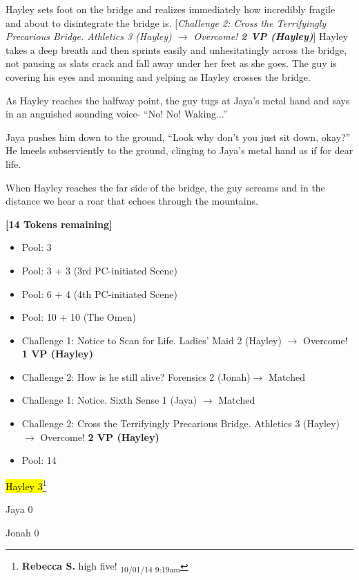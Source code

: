 Hayley sets foot on the bridge and realizes immediately how incredibly fragile and about to disintegrate the bridge is.  {[}\textit{Challenge 2: Cross the Terrifyingly Precarious Bridge.  Athletics 3 (Hayley) $\rightarrow$ Overcome! }\textit{\textbf{2 VP (Hayley)}}{]}  Hayley takes a deep breath and then sprints easily and unhesitatingly across the bridge, not pausing as slats crack and fall away under her feet as she goes.  The guy is covering his eyes and moaning and yelping as Hayley crosses the bridge.

As Hayley reaches the halfway point, the guy tugs at Jaya's metal hand and says in an anguished sounding voice- ``No!  No!  Waking...''

Jaya pushes him down to the ground, ``Look why don't you just sit down, okay?''  He kneels subserviently to the ground, clinging to Jaya's metal hand as if for dear life.

When Hayley reaches the far side of the bridge, the guy screams and in the distance we hear a roar that echoes through the mountains.



\textbf{{[}14 Tokens remaining{]}}



\newpage
{}

\begin{itemize}[noitemsep,topsep=0pt]
\item Pool: 3
\item Pool: 3 + 3 (3rd PC-initiated Scene)
\item Pool: 6 + 4 (4th PC-initiated Scene)
\item Pool: 10 + 10 (The Omen)
\item Challenge 1: Notice to Scan for Life.  Ladies' Maid 2 (Hayley) $\rightarrow$ Overcome! \textbf{1 VP (Hayley)}
\item Challenge 2:  How is he still alive?  Forensics 2 (Jonah)$\rightarrow$ Matched
\item Challenge 1: Notice.  Sixth Sense 1 (Jaya) $\rightarrow$ Matched 
\item Challenge 2: Cross the Terrifyingly Precarious Bridge.  Athletics 3 (Hayley) $\rightarrow$ Overcome! \textbf{2 VP (Hayley)}
\item Pool: 14
\end{itemize}





{\parskip=0pt
\hl{Hayley 3}\footnote{\textbf{Rebecca S. }high five! \textsubscript{10/01/14 9:19am}}

Jaya 0

Jonah 0
}



